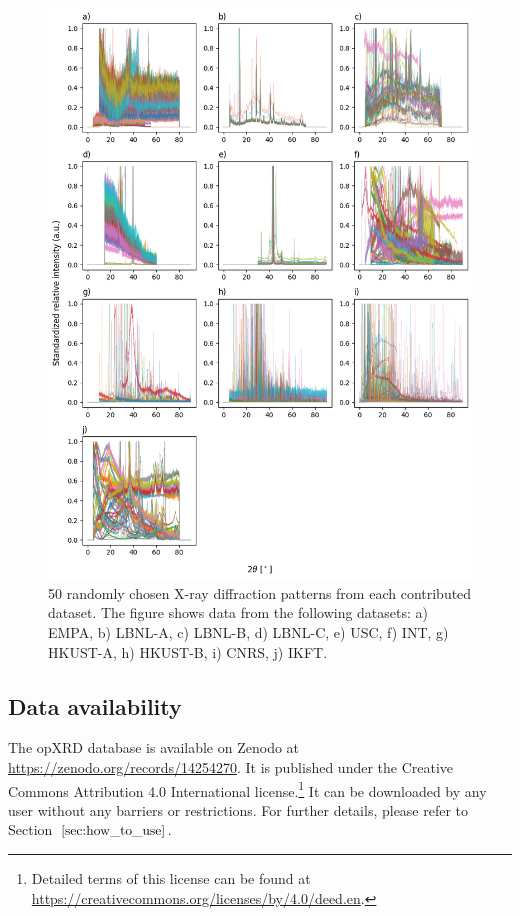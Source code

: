 \documentclass[a4paper]{article}
\begin{document}
\begin{figure}[!htb]
    \centering
    \includegraphics[width=\linewidth]{figures/combined.png}
    \caption{50 randomly chosen X-ray diffraction patterns from each contributed dataset. The figure shows data from the following datasets: a) EMPA, b) LBNL-A, c) LBNL-B, d) LBNL-C, e) USC, f) INT, g) HKUST-A, h) HKUST-B, i) CNRS, j) IKFT.}
    \label{fig:combined}
\end{figure}

\pagebreak

\subsection*{Data availability}
The opXRD database is available on Zenodo at \url{https://zenodo.org/records/14254270}. It is published under the Creative Commons Attribution 4.0 International license.\footnote{Detailed terms of this license can be found at \url{https://creativecommons.org/licenses/by/4.0/deed.en}.} It can be downloaded by any user without any barriers or restrictions. For further details, please refer to Section~$\eqref{sec:how_to_use}$.
\end{document}
